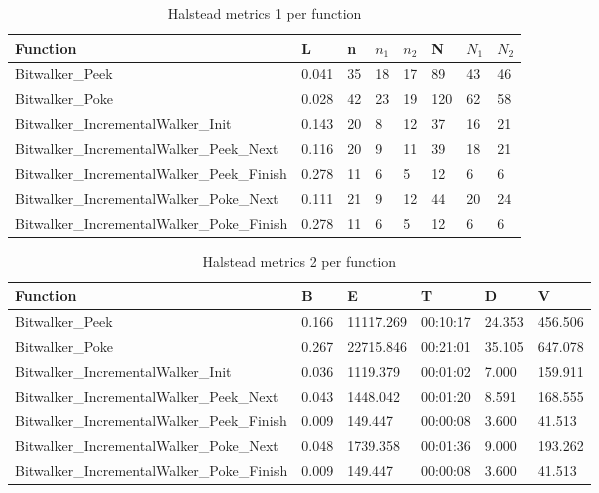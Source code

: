 \begin{description}
\begin{longtable}{||p{}|p{}|p{}|p{}|p{}|p{}|p{}|p{}||}
  \caption{Halstead metrics 1 per function}\\
    \hline\hline
    \textbf{Function} &\textbf{L} & \textbf{n} & \textbf{$n_1$} & \textbf{$n_2$} & \textbf{N} & \textbf{$N_1$} & \textbf{$N_2$}\\
    \hline\hline
    \endhead
    \hline\hline
    \endfoot
    Bitwalker\_Peek & 0.041 & 35 & 18 & 17 & 89 & 43 & 46
    \\
    \hline
    Bitwalker\_Poke & 0.028 & 42 & 23 & 19 & 120 & 62 & 58
    \\
    \hline
    Bitwalker\_IncrementalWalker\_Init & 0.143 & 20 & 8 & 12 & 37 & 16 & 21
    \\
    \hline
    Bitwalker\_IncrementalWalker\_Peek\_Next & 0.116 & 20 & 9 & 11 & 39 & 18 & 21
    \\
    \hline
    Bitwalker\_IncrementalWalker\_Peek\_Finish & 0.278 & 11 & 6 & 5 & 12 & 6 & 6
    \\
    \hline
    Bitwalker\_IncrementalWalker\_Poke\_Next & 0.111 & 21 & 9 & 12 & 44 & 20 & 24
    \\
    \hline
    Bitwalker\_IncrementalWalker\_Poke\_Finish & 0.278 & 11 & 6 & 5 & 12 & 6 & 6
    \\
    \hline
   \end{longtable}
   
\begin{longtable}{||p{}|p{}|p{}|p{}|p{}|p{}||}
  \caption{Halstead metrics 2 per function}\\
    \hline\hline
    \textbf{Function} &\textbf{B} & \textbf{E} & \textbf{T} & \textbf{D} & \textbf{V}\\
    \hline\hline
    \endhead
    \hline\hline
    \endfoot
    Bitwalker\_Peek & 0.166 & 11117.269 & 00:10:17 & 24.353 & 456.506 
    \\
    \hline
    Bitwalker\_Poke & 0.267 & 22715.846 & 00:21:01 & 35.105 & 647.078 
    \\
    \hline
    Bitwalker\_IncrementalWalker\_Init & 0.036 & 1119.379 & 00:01:02 & 7.000 & 159.911 
    \\
    \hline
    Bitwalker\_IncrementalWalker\_Peek\_Next & 0.043 & 1448.042 & 00:01:20 & 8.591 & 168.555 
    \\
    \hline
    Bitwalker\_IncrementalWalker\_Peek\_Finish & 0.009 & 149.447 & 00:00:08 & 3.600 & 41.513 
    \\
    \hline
    Bitwalker\_IncrementalWalker\_Poke\_Next & 0.048 & 1739.358 & 00:01:36 & 9.000 & 193.262 
    \\
    \hline
    Bitwalker\_IncrementalWalker\_Poke\_Finish & 0.009 & 149.447 & 00:00:08 & 3.600 & 41.513 
    \\
    \hline
   \end{longtable}

\end{description}

